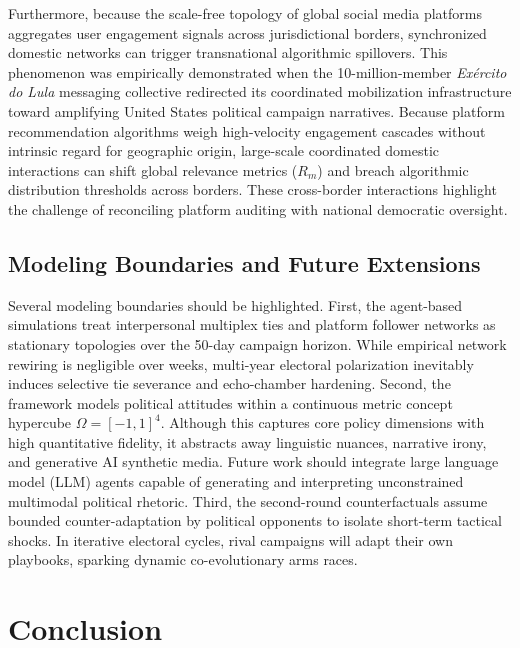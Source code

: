 \documentclass[a4paper,fleqn]{cas-dc}
\begin{document}
Furthermore, because the scale-free topology of global social media platforms aggregates user engagement signals across jurisdictional borders, synchronized domestic networks can trigger transnational algorithmic spillovers. This phenomenon was empirically demonstrated when the 10-million-member \emph{Ex\'ercito do Lula} messaging collective redirected its coordinated mobilization infrastructure toward amplifying United States political campaign narratives. Because platform recommendation algorithms weigh high-velocity engagement cascades without intrinsic regard for geographic origin, large-scale coordinated domestic interactions can shift global relevance metrics ($R_m$) and breach algorithmic distribution thresholds across borders. These cross-border interactions highlight the challenge of reconciling platform auditing with national democratic oversight.

\subsection{Modeling Boundaries and Future Extensions}
\label{subsec:limitations}
Several modeling boundaries should be highlighted. First, the agent-based simulations treat interpersonal multiplex ties and platform follower networks as stationary topologies over the 50-day campaign horizon. While empirical network rewiring is negligible over weeks, multi-year electoral polarization inevitably induces selective tie severance and echo-chamber hardening. Second, the framework models political attitudes within a continuous metric concept hypercube $\Omega = [-1, 1]^4$. Although this captures core policy dimensions with high quantitative fidelity, it abstracts away linguistic nuances, narrative irony, and generative AI synthetic media. Future work should integrate large language model (LLM) agents capable of generating and interpreting unconstrained multimodal political rhetoric. Third, the second-round counterfactuals assume bounded counter-adaptation by political opponents to isolate short-term tactical shocks. In iterative electoral cycles, rival campaigns will adapt their own playbooks, sparking dynamic co-evolutionary arms races.

\section{Conclusion}
\label{sec:conclusion}
\end{document}
